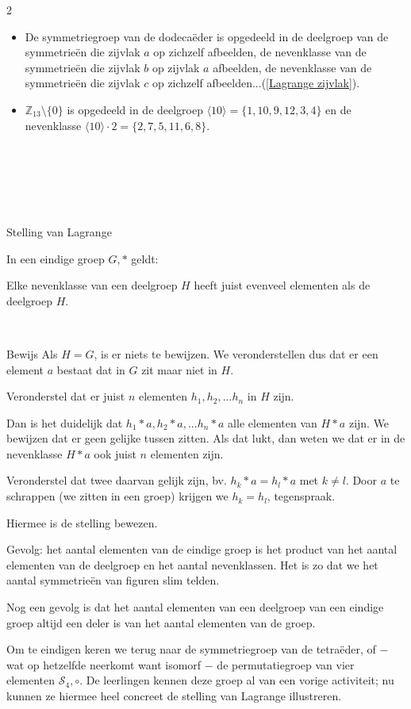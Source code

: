 \begin{multicols}{2}
\begin{itemize}
\vspace{1.5cm}
\item De symmetriegroep van de dodecaëder is opgedeeld in de deelgroep van de symmetrieën die zijvlak $a$ op zichzelf afbeelden, de nevenklasse van de symmetrieën die zijvlak $b$ op zijvlak $a$ afbeelden, de nevenklasse van de symmetrieën die zijvlak $c$ op zichzelf afbeelden...(\autoref{Lagrange zijvlak}).
\item $\mathbb{Z}_{13}\setminus\{0\}$ is opgedeeld in de deelgroep $\langle10\rangle=\{1, 10, 9, 12, 3, 4\}$ en de nevenklasse $\langle10\rangle\cdot 2 = \{2, 7, 5, 11, 6, 8\}$.

\end{itemize}
$    $

$    $

$     $

\begin{kader}{Stelling van Lagrange}{}

    In een eindige groep $G,*$ geldt:
    
    Elke nevenklasse van een deelgroep $H$ heeft juist evenveel elementen als de deelgroep $H$.
\end{kader}
$    $
\begin{kader}{Bewijs}{}
    Als $H=G$, is er niets te bewijzen. We veronderstellen dus dat er een element $a$ bestaat dat in $G$ zit maar niet in $H$. \par    
    Veronderstel dat er juist $n$ elementen $h_1, h_2, ... h_n$ in $H$ zijn.\par    
    Dan is het duidelijk dat $h_1*a, h_2*a, ... h_n*a$ alle elementen van $H*a$ zijn. We bewijzen dat er geen gelijke tussen zitten. Als dat lukt, dan weten we dat er in de nevenklasse $H*a$ ook juist $n$ elementen zijn.\par
        Veronderstel dat twee daarvan gelijk zijn, bv. $h_k*a=h_l*a$ met $k\ne l$. Door $a$ te schrappen (we zitten in een groep) krijgen we $h_k=h_l$, tegenspraak.\par          
    Hiermee is de stelling bewezen.
\end{kader}

Gevolg: het aantal elementen van de eindige groep is het product van het aantal elementen van de deelgroep en het aantal nevenklassen. Het is zo dat we het aantal symmetrieën van figuren slim telden. 

Nog een gevolg is dat het aantal elementen van een deelgroep van een eindige groep altijd een deler is van het aantal elementen van de groep.

Om te eindigen keren we terug naar de symmetriegroep van de tetraëder, of $-$ wat op hetzelfde neerkomt want isomorf $-$ de permutatiegroep van vier elementen $\mathscr{S}_4, \circ$. De leerlingen kennen deze groep al van een vorige activiteit; nu kunnen ze hiermee heel concreet de stelling van Lagrange illustreren.

\end{multicols}

